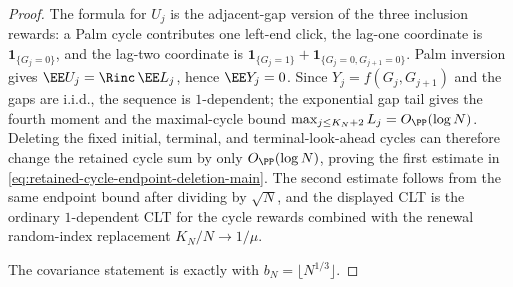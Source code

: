 \begin{proof}
The formula for \(U_j\) is the adjacent-gap version of the three inclusion
rewards: a Palm cycle contributes one left-end click, the lag-one coordinate
is \(\mathbf1_{\{G_j=0\}}\), and the lag-two coordinate is
\(\mathbf1_{\{G_j=1\}}+\mathbf1_{\{G_j=0,G_{j+1}=0\}}\).  Palm inversion gives
\(\EE U_j=\Rinc\,\EE L_j\), hence \(\EE Y_j=0\).  Since \(Y_j=f(G_j,G_{j+1})\)
and the gaps are i.i.d., the sequence is \(1\)-dependent; the exponential gap
tail gives the fourth moment and the maximal-cycle bound
\(\max_{j\le K_N+2}L_j=O_{\PP}(\log N)\).  Deleting the fixed initial,
terminal, and terminal-look-ahead cycles can therefore change the retained
cycle sum by only \(O_{\PP}(\log N)\), proving the first estimate in
\eqref{eq:retained-cycle-endpoint-deletion-main}.  The second estimate follows
from the same endpoint bound after dividing by \(\sqrt N\), and the displayed
CLT is the ordinary \(1\)-dependent CLT for the cycle rewards combined with
the renewal random-index replacement \(K_N/N\to1/\mu\).

The covariance statement is exactly
 with
\(b_N=\lfloor N^{1/3}\rfloor\).
\end{proof}

